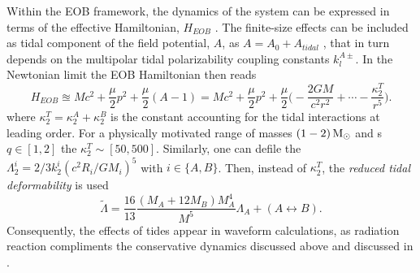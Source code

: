 Within the \ac{EOB} framework, the dynamics of the system can be expressed in terms of the 
effective Hamiltonian, $H_{EOB}$
%
.
The finite-size effects can be included as tidal component of the field potential, $A$, as 
$A = A_0 + A_{tidal}$ \citep{Bini:2012gu}, 
that in turn depends on the multipolar tidal polarizability coupling constants $k_{l}^{A\pm}$.
%
In the Newtonian limit the \ac{EOB} Hamiltonian then reads 
%
\begin{equation}
H_{EOB} \approxeq Mc^2 + \frac{\mu}{2}p^2 + \frac{\mu}{2}(A-1) = Mc^2 + \frac{\mu}{2}p^2 + 
\frac{\mu}{2}\Big( -\frac{2 G M}{c^2 r^2} + \cdots - \frac{\kappa_2^T}{r^5} \Big).
\end{equation}
%
where $\kappa_2^T = \kappa_2^A + \kappa_2^B$ is the constant accounting for the tidal 
interactions at leading order.
%
For a physically motivated range of masses $(1-2)\,{\text{M}_{\odot}}$ and \mr{}s $q\in[1,2]$ the 
$\kappa_2^T\sim[50,500]$. 
%
Similarly, one can defile the $\Lambda_2^i = 2/3 k_2^i (c^2 R_i/GM_i)^5$ with $i\in\{A,B\}$.
Then, instead of $\kappa_2^T$, the \textit{reduced tidal deformability} is used
%
\begin{equation}
\label{eq:intro:Lambda}
\tilde{\Lambda} = \frac{16}{13}\frac{(M_A + 12M_B)M_A^4}{M^5}\Lambda_A + (A\leftrightarrow B).
\end{equation}
%
Consequently, the effects of tides appear in waveform calculations, as radiation reaction 
compliments the conservative dynamics discussed above \citep{Damour:2008gu} 
and discussed in \citet{Damour:2012yf,Banihashemi:2018xfb}.


